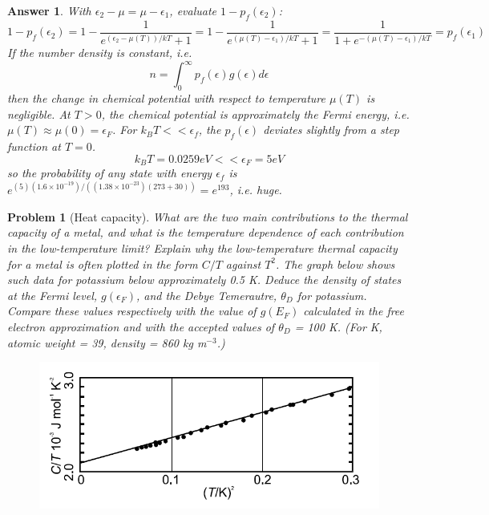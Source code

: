 \documentclass[a4paper]{article}
\newtheorem{ans}{Answer}[section]
\theoremstyle{new}
\newtheorem{qns}{Problem}[section]
\begin{document}
\begin{ans}
With $\epsilon_2-\mu=\mu-\epsilon_1$, evaluate $1-p_f(\epsilon_2)$:
$$1-p_f(\epsilon_2)=1-\frac{1}{e^{(\epsilon_2-\mu(T))/kT}+1}=1-\frac{1}{e^{(\mu(T)-\epsilon_1)/kT}+1}=\frac{1}{1+e^{-(\mu(T)-\epsilon_1)/kT}}=p_f(\epsilon_1)$$
If the number density is constant, i.e.
$$n=\int_0^\infty p_f(\epsilon) g(\epsilon)d\epsilon$$
then the change in chemical potential with respect to temperature $\mu(T)$ is negligible. At $T>0$, the chemical potential is approximately the Fermi energy, i.e.  $\mu(T)\approx\mu(0)=\epsilon_F$. For $k_BT<<\epsilon_f$, the $p_f(\epsilon)$ deviates slightly from a step function at $T=0$.
$$k_BT=0.0259eV<<\epsilon_F=5eV$$
so the probability of any state with energy $\epsilon_f$ is $e^{(5)(1.6\times10^{-19})/((1.38\times10^{-23})(273+30))}=e^{193}$, i.e. huge.
\end{ans}
\newpage
\begin{qns}[Heat capacity]
What are the two main contributions to the thermal capacity of a metal, and what is the temperature dependence of each contribution in the low-temperature limit? Explain why the low-temperature thermal capacity for a metal is often plotted in the form $C/T$ against $T^2$. The graph below shows such data for potassium below approximately 0.5 K. Deduce the density of states at the Fermi level, $g(\epsilon_F)$, and the Debye Temerautre, $\theta_D$ for potassium. Compare these values respectively with the value of $g(E_F)$ calculated in the free electron approximation and with the accepted values of $\theta_D$ = 100 K. (For K, atomic weight = 39, density = 860 kg m$^{-3}$.)
\begin{figure}[H]
    \centering
    \includegraphics[width=\linewidth]{4_3_2.PNG}
\end{figure}
\end{qns}
\end{document}
